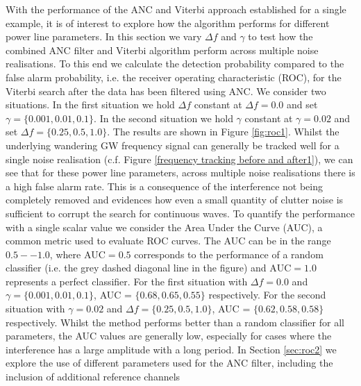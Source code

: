 \documentclass[pra,superscriptaddress,reprint,amsmath,amssymb,nofootinbib]{revtex4-2}
\begin{document}
With the performance of the ANC and Viterbi approach established for a single example, it is of interest to explore how the algorithm performs for different power line parameters. In this section we vary $\Delta f$ and $\gamma$ to test how the combined ANC filter and Viterbi algorithm perform across multiple noise realisations. To this end we calculate the detection probability compared to the false alarm probability, i.e. the receiver operating characteristic (ROC), for the Viterbi search after the data has been filtered using ANC. We consider two situations. In the first situation we hold $\Delta f$ constant at $\Delta f =0.0$ and set $\gamma = \{ 0.001, 0.01, 0.1\}$. In the second situation we hold $\gamma$ constant at $\gamma = 0.02$ and set  $\Delta f = \{0.25, 0.5,1.0\}$. The results are shown in Figure \ref{fig:roc1}. Whilst the underlying wandering GW frequency signal can generally be tracked well for a single noise realisation (c.f. Figure \ref{frequency tracking before and after1}), we can see that for these power line parameters, across multiple noise realisations there is a high false alarm rate. This is a consequence of the interference not being completely removed and evidences how even a small quantity of clutter noise is sufficient to corrupt the search for continuous waves. To quantify the performance with a single scalar value we consider the Area Under the Curve (AUC), a common metric used to evaluate ROC curves. The AUC can be in the range $0.5 -- 1.0$, where $\text{AUC} = 0.5$ corresponds to the performance of a random classifier (i.e. the grey dashed diagonal line in the figure) and $\text{AUC} = 1.0$ represents a perfect classifier. For the first situation with $\Delta f =0.0$ and $\gamma = \{0.001, 0.01, 0.1\}$, AUC = $\{0.68, 0.65,0.55\}$ respectively. For the second situation with $\gamma = 0.02$ and $\Delta f = \{0.25, 0.5,1.0\}$, AUC = $\{0.62, 0.58,0.58\}$ respectively. Whilst the method performs better than a random classifier for all parameters, the AUC values are generally low, especially for cases where the interference has a large amplitude with a long period. In Section \ref{sec:roc2} we explore the use of different parameters used for the ANC filter, including the inclusion of additional reference channels
\end{document}
